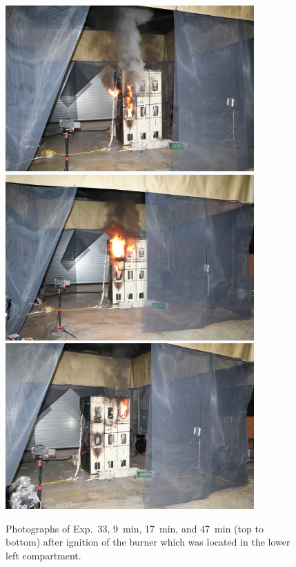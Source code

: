 \begin{figure}[p]
\centering
\includegraphics[height=2.50in]{../FIGURES/Test_33_9_min} \\ \vspace{0.1in}
\includegraphics[height=2.50in]{../FIGURES/Test_33_17_min} \\ \vspace{0.1in}
\includegraphics[height=2.50in]{../FIGURES/Test_33_47_min}
\caption[Photographs of Exp.~33]{Photographs of Exp.~33, 9~min, 17~min, and 47~min (top to bottom) after ignition of the burner which was located in the lower left compartment.}
\label{fig:Test_33_photos}
\end{figure}



